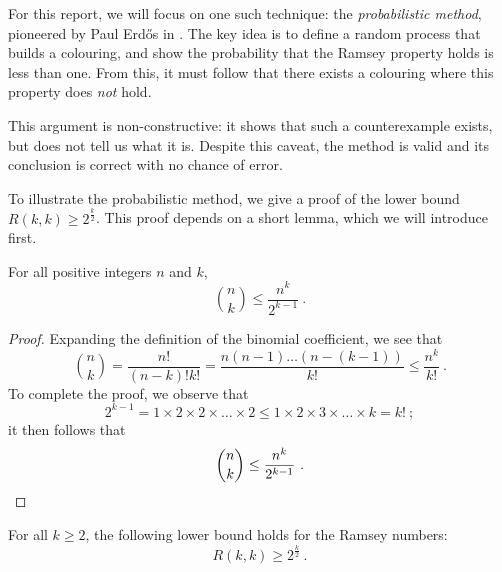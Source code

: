 \documentclass{article}
\begin{document}
For this report, we will focus on one such technique: the \textit{probabilistic method}, pioneered by Paul Erdős in \citeyear{erdos1947some}. The key idea is to define a random process that builds a colouring, and show the probability that the Ramsey property holds is less than one. From this, it must follow that there exists a colouring where this property does \emph{not} hold.

This argument is non-constructive: it shows that such a counterexample exists, but does not tell us what it is. Despite this caveat, the method is valid and its conclusion is correct with no chance of error.

To illustrate the probabilistic method, we give a proof of the lower bound $R(k,k) \geq 2^{\frac k 2}$. This proof depends on a short lemma, which we will introduce first.

\begin{Lemma} \label{binomial_bound}
    For all positive integers $n$ and $k$,
    \[ {n \choose k} \leq \frac{n^k}{2^{k-1}} \ . \]
\end{Lemma}

\begin{proof}
    Expanding the definition of the binomial coefficient, we see that
    \[
        {n \choose k}
        = \frac{n!}{(n-k)!k!}
        = \frac{n(n-1)\ldots(n-(k-1))}{k!}
        \leq \frac{n^k}{k!} \ .
    \]
    To complete the proof, we observe that
    \[
        2^{k-1}
        = 1 \times 2 \times 2 \times \ldots \times 2
        \leq 1 \times 2 \times 3 \times \ldots \times k
        = k! \ ;
    \]
    it then follows that
    \[
        {n \choose k} \leq \frac{n^k}{2^{k-1}} \ . \qedhere
    \]
\end{proof}

\begin{Theorem}
    For all $k \geq 2$, the following lower bound holds for the Ramsey numbers:
    \[ R(k,k) \geq 2^{\frac k 2} \ . \]
\end{Theorem}
\end{document}
